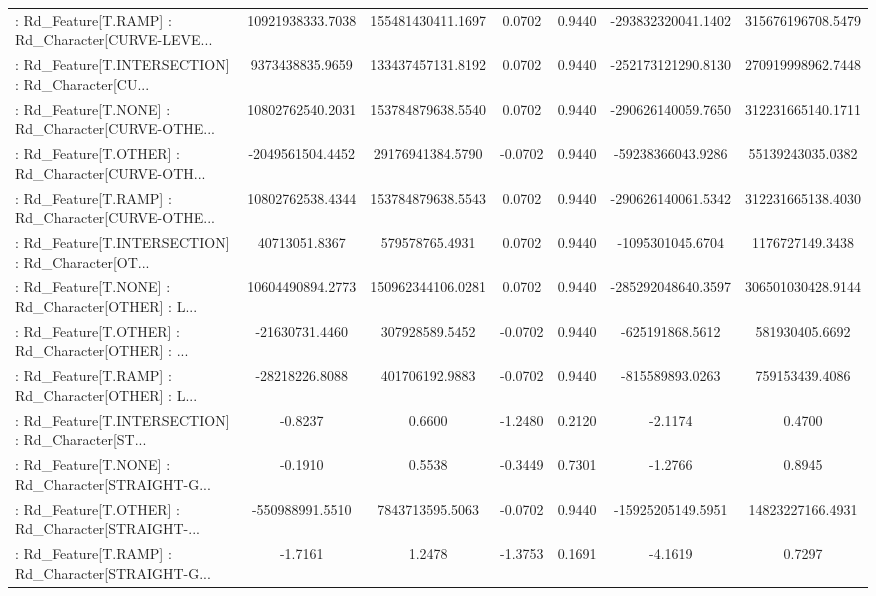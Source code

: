 \begin{longtable}{p{4cm}cccccc}
 : Rd\_Feature[T.RAMP] : Rd\_Character[CURVE-LEVE... &  10921938333.7038 & 155481430411.1697 &  0.0702 &       0.9440 & -293832320041.1402 & 315676196708.5479 \\
 : Rd\_Feature[T.INTERSECTION] : Rd\_Character[CU... &   9373438835.9659 & 133437457131.8192 &  0.0702 &       0.9440 & -252173121290.8130 & 270919998962.7448 \\
 : Rd\_Feature[T.NONE] : Rd\_Character[CURVE-OTHE... &  10802762540.2031 & 153784879638.5540 &  0.0702 &       0.9440 & -290626140059.7650 & 312231665140.1711 \\
 : Rd\_Feature[T.OTHER] : Rd\_Character[CURVE-OTH... &  -2049561504.4452 &  29176941384.5790 & -0.0702 &       0.9440 &  -59238366043.9286 &  55139243035.0382 \\
 : Rd\_Feature[T.RAMP] : Rd\_Character[CURVE-OTHE... &  10802762538.4344 & 153784879638.5543 &  0.0702 &       0.9440 & -290626140061.5342 & 312231665138.4030 \\
 : Rd\_Feature[T.INTERSECTION] : Rd\_Character[OT... &     40713051.8367 &    579578765.4931 &  0.0702 &       0.9440 &   -1095301045.6704 &   1176727149.3438 \\
 : Rd\_Feature[T.NONE] : Rd\_Character[OTHER] : L... &  10604490894.2773 & 150962344106.0281 &  0.0702 &       0.9440 & -285292048640.3597 & 306501030428.9144 \\
 : Rd\_Feature[T.OTHER] : Rd\_Character[OTHER] : ... &    -21630731.4460 &    307928589.5452 & -0.0702 &       0.9440 &    -625191868.5612 &    581930405.6692 \\
 : Rd\_Feature[T.RAMP] : Rd\_Character[OTHER] : L... &    -28218226.8088 &    401706192.9883 & -0.0702 &       0.9440 &    -815589893.0263 &    759153439.4086 \\
 : Rd\_Feature[T.INTERSECTION] : Rd\_Character[ST... &           -0.8237 &            0.6600 & -1.2480 &       0.2120 &            -2.1174 &            0.4700 \\
 : Rd\_Feature[T.NONE] : Rd\_Character[STRAIGHT-G... &           -0.1910 &            0.5538 & -0.3449 &       0.7301 &            -1.2766 &            0.8945 \\
 : Rd\_Feature[T.OTHER] : Rd\_Character[STRAIGHT-... &   -550988991.5510 &   7843713595.5063 & -0.0702 &       0.9440 &  -15925205149.5951 &  14823227166.4931 \\
 : Rd\_Feature[T.RAMP] : Rd\_Character[STRAIGHT-G... &           -1.7161 &            1.2478 & -1.3753 &       0.1691 &            -4.1619 &            0.7297 \\

\end{longtable}

